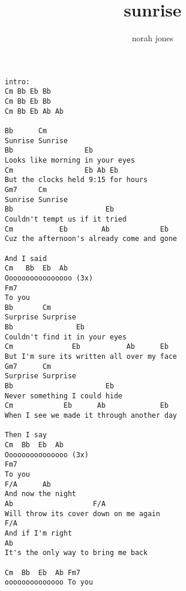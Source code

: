 \author{norah jones}
\title{sunrise}
\maketitle
\begin{verbatim}
intro: 
Cm Bb Eb Bb
Cm Bb Eb Bb
Cm Bb Eb Ab Ab

Bb      Cm
Sunrise Sunrise 
Bb                 Eb 
Looks like morning in your eyes
Cm                 Eb Ab Eb
But the clocks held 9:15 for hours 
Gm7     Cm
Sunrise Sunrise 
Bb                      Eb
Couldn't tempt us if it tried 
Cm           Eb        Ab            Eb
Cuz the afternoon's already come and gone 

And I said 
Cm   Bb  Eb  Ab
Oooooooooooooooo (3x)
Fm7
To you 
Bb       Cm
Surprise Surprise 
Bb               Eb
Couldn't find it in your eyes 
Cm              Eb           Ab      Eb
But I'm sure its written all over my face 
Gm7      Cm
Surprise Surprise 
Bb                      Eb
Never something I could hide
Cm            Eb      Ab             Eb
When I see we made it through another day 

Then I say 
Cm  Bb  Eb  Ab
Ooooooooooooooo (3x)
Fm7
To you 
F/A      Ab
And now the night 
Ab                   F/A 
Will throw its cover down on me again 
F/A
And if I'm right 
Ab
It's the only way to bring me back 

Cm  Bb  Eb  Ab Fm7
oooooooooooooo To you
\end{verbatim}